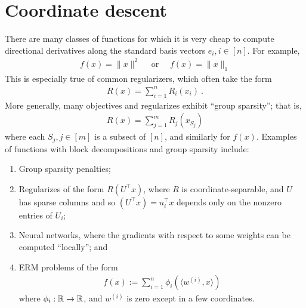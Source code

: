 \section{Coordinate descent}
There are many classes of functions for which it is very cheap 
to compute directional derivatives along the standard basis vectors
$e_i, i \in [n]$.
%
For example, 
%
\begin{eqnarray}
f(x) = \|x\|^2\quad \text{ or }\quad f(x) = \|x\|_1
\end{eqnarray}
%
This is especially true of common regularizers, 
%
which often take the form 
\begin{eqnarray}
R(x) = \sum_{i=1}^n R_i(x_i) \ .
\end{eqnarray}
%
More generally, many objectives and regularizes exhibit ``group sparsity''; that is,
%
\begin{eqnarray}
R(x) =  \sum_{j=1}^m R_{j}(x_{S_j})
\end{eqnarray}
where each $S_j, j \in [m]$ is a subsect of $[n]$, and similarly for $f(x)$.
%
Examples of functions with block decompositions and group sparsity include:
\begin{enumerate} 
	\item Group sparsity penalties;
	\item Regularizes of the form $R(U^\top x)$, where $R$ is
    coordinate-separable, and $U$ has sparse columns and so
    $(U^\top x) = u_i^\top x$ depends only on the nonzero entries of $U_i$;
	\item Neural networks, where the gradients with respect to some weights can be
    computed ``locally''; and
	\item ERM problems of the form 
    \begin{eqnarray}
    f(x) := \sum_{i=1}^n \phi_i(\langle w^{(i)} , x \rangle )
    \end{eqnarray}
    where $\phi_i: \mathbb{R} \to \mathbb{R}$, and $w^{(i)}$ is zero except in a few coordinates. 
\end{enumerate} 

